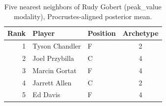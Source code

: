 \begin{table}[htbp]
  \centering\small
  \begin{tabular}{rllc}
    \toprule
    Rank & Player & Position & Archetype \\
    \midrule
    1 & Tyson Chandler & F & 2 \\
    2 & Joel Przybilla & C & 4 \\
    3 & Marcin Gortat & F & 4 \\
    4 & Jarrett Allen & C & 2 \\
    5 & Ed Davis & F & 4 \\
    \bottomrule
  \end{tabular}
  \caption{Five nearest neighbors of Rudy Gobert (peak_value modality), Procrustes-aligned posterior mean.}
  \label{tab:Rudy_Gobert_neighbors_peak_value}
\end{table}

